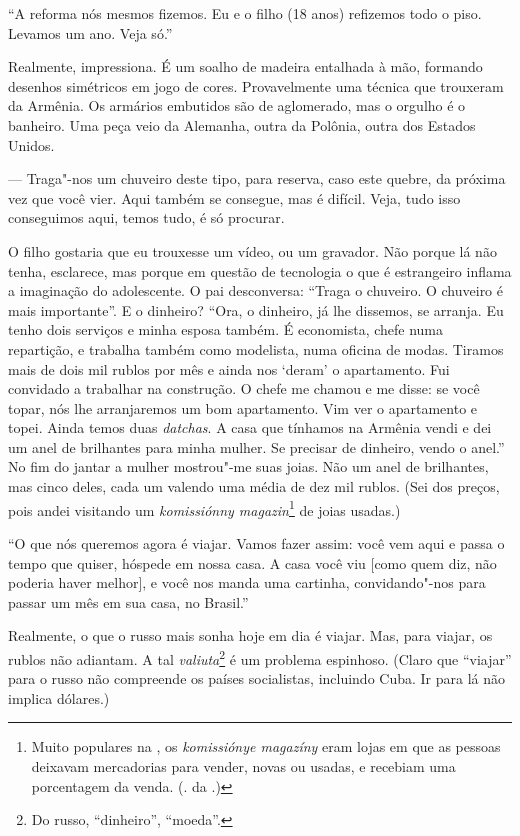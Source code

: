 {{{``A reforma nós mesmos fizemos. Eu e o filho (18 anos) refizemos todo o piso. Levamos um ano. Veja só.''

Realmente, impressiona. É um soalho de madeira entalhada à mão, formando desenhos simétricos em jogo de cores. Provavelmente uma
técnica que trouxeram da Armênia. Os armários embutidos são de aglomerado, mas o orgulho é o banheiro. Uma peça veio da Alemanha, outra da Polônia, outra dos Estados Unidos.

--- Traga"-nos um chuveiro deste tipo, para reserva, caso este quebre, da próxima vez que você vier. Aqui também se consegue, mas é difícil. Veja, tudo isso conseguimos aqui, temos tudo, é só procurar.

O filho gostaria que eu trouxesse um vídeo, ou um gravador. Não porque lá não tenha, esclarece, mas porque em questão de tecnologia o que é estrangeiro inflama a imaginação do adolescente. O pai desconversa: ``Traga o chuveiro. O chuveiro é mais importante''. E o dinheiro? ``Ora, o dinheiro, já lhe dissemos, se arranja. Eu tenho dois serviços e minha esposa também. É economista, chefe numa repartição, e trabalha também como modelista, numa oficina de modas. Tiramos mais de dois mil rublos por mês e ainda nos `deram' o apartamento. Fui convidado a trabalhar na construção. O chefe me chamou e me disse: se você topar, nós lhe arranjaremos um bom apartamento. Vim ver o apartamento e topei. Ainda temos duas \emph{datchas}. A casa que tínhamos na Armênia vendi e dei um anel de brilhantes para minha mulher. Se precisar de dinheiro, vendo o anel.'' No fim do jantar a mulher mostrou"-me suas joias. Não um anel de brilhantes, mas cinco deles, cada um valendo uma média de dez mil rublos. (Sei dos preços, pois andei visitando um \emph{komissiónny magazin}\footnote{Muito populares na , os \emph{komissiónye magazíny} eram lojas em que as pessoas deixavam mercadorias para vender, novas ou usadas, e recebiam uma porcentagem da venda. (. da .)} de joias usadas.)

``O que nós queremos agora é viajar. Vamos fazer assim: você vem aqui e passa o tempo que quiser, hóspede em nossa casa. A casa você viu [como quem diz, não poderia haver melhor], e você nos manda uma cartinha, convidando"-nos para passar um mês em sua casa, no Brasil.''

Realmente, o que o russo mais sonha hoje em dia é viajar. Mas, para viajar, os rublos não adiantam. A tal \emph{valiuta}\footnote{Do russo, ``dinheiro'', ``moeda''.} é um problema espinhoso. (Claro que ``viajar'' para o russo não compreende os países socialistas, incluindo Cuba. Ir para lá não implica dólares.)

}}}
